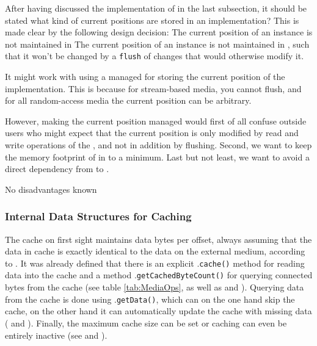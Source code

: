 After having discussed the implementation of \MediumReferenceRepository{} in the last subsection, it should be stated what kind of current positions are stored in an \IMediumAccessor{} implementation? This is made clear by the following design decision:
{%
The current position of an \IMediumAccessor{} instance is not maintained in \MediumReferenceRepository{}
}
{%
The current position of an \IMediumAccessor{} instance is not maintained in \MediumReferenceRepository{}, such that it won't be changed by a \texttt{flush} of changes that would otherwise modify it.
}
{%
It might work with using a managed \IMediumReference{} for storing the current position of the \IMediumAccessor{} implementation. This is because for stream-based media, you cannot flush, and for all random-access media the current position can be arbitrary.

However, making the current position managed would first of all confuse outside users who might expect that the current position is only modified by read and write operations of the \IMediumAccessor{}, and not in addition by flushing. Second, we want to keep the memory footprint of \IMediumReference{} in \MediumReferenceRepository{} to a minimum. Last but not least, we want to avoid a direct dependency from \IMediumAccessor{} to \MediumReferenceRepository{}.
}
{%
No disadvantages known
}


\subsubsection{Internal Data Structures  for Caching}
\label{sec:Datenstrukturen}

The cache on first sight maintains data bytes per offset, always assuming that the data in cache is exactly identical to the data on the external medium, according to . It was already defined that there is an explicit \IMediumStore{}.\texttt{cache()} method for reading data into the cache and a method \IMediumStore{}.\texttt{getCachedByteCount()} for querying connected bytes from the cache (see table \hyperref[tab:MediaOps]{\ref{tab:MediaOps}}, as well as  and ). Querying data from the cache is done using \IMediumStore{}.\texttt{getData()}, which can on the one hand skip the cache, on the other hand it can automatically update the cache with missing data ( and ). Finally, the maximum cache size can be set or caching can even be entirely inactive (see  and ).

